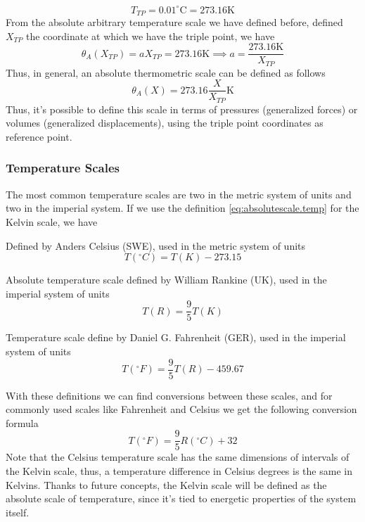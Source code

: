 \documentclass[../qm.tex]{subfiles}
\begin{document}
\begin{equation*}
	T_{TP}=0.01^\circ\mathrm{C}=273.16\mathrm{ K}
\end{equation*}
From the absolute arbitrary temperature scale we have defined before, defined $X_{TP}$ the coordinate at which we have the triple point, we have
\begin{equation*}
	\theta_A(X_{TP})=aX_{TP}=273.16\mathrm{ K}\implies a=\frac{273.16\mathrm{ K}}{X_{TP}}
\end{equation*}
Thus, in general, an absolute thermometric scale can be defined as follows
\begin{equation}
	\theta_A(X)=273.16\frac{X}{X_{TP}}\mathrm{ K}
	\label{eq:absolutescale.temp}
\end{equation}
Thus, it's possible to define this scale in terms of pressures (generalized forces) or volumes (generalized displacements), using the triple point coordinates as reference point.
\subsubsection{Temperature Scales}
The most common temperature scales are two in the metric system of units and two in the imperial system. If we use the definition \eqref{eq:absolutescale.temp} for the Kelvin scale, we have
\begin{dfn}
	Defined by Anders Celsius (SWE), used in the metric system of units
	\begin{equation*}
		T\left( ^\circ C \right)=T\left( K \right)-273.15
	\end{equation*}
\end{dfn}
\begin{dfn}
	Absolute temperature scale defined by William Rankine (UK), used in the imperial system of units
	\begin{equation*}
		T\left( R \right)=\frac{9}{5}T\left( K \right)
	\end{equation*}
\end{dfn}
\begin{dfn}
	Temperature scale define by Daniel G. Fahrenheit (GER), used in the imperial system of units
	\begin{equation*}
		T\left( ^\circ F \right)=\frac{9}{5}T\left( R \right)-459.67
	\end{equation*}
\end{dfn}
With these definitions we can find conversions between these scales, and for commonly used scales like Fahrenheit and Celsius we get the following conversion formula
\begin{equation}
	T\left( ^\circ F \right)=\frac{9}{5}R\left( ^\circ C \right)+32
	\label{eq:ftoc.temp}
\end{equation}
Note that the Celsius temperature scale has the same dimensions of intervals of the Kelvin scale, thus, a temperature difference in Celsius degrees is the same in Kelvins. Thanks to future concepts, the Kelvin scale will be defined as the absolute scale of temperature, since it's tied to energetic properties of the system itself.
\end{document}

